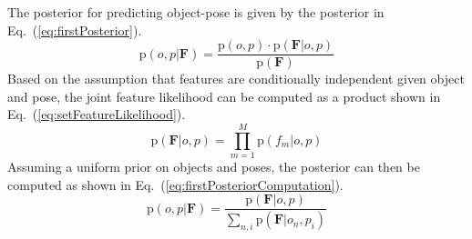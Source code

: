 \documentclass[conference]{IEEEtran}
\renewcommand{\eqref}[1]{Eq.~(\ref{#1})}
\newcommand{\prob}[1]{\text{p}(#1)} %
\newcommand{\set}[1]{\mathbf{#1}} %
\begin{document}
        The posterior for predicting object-pose is given by the posterior in \eqref{eq:firstPosterior}.
        \begin{equation}
            \label{eq:firstPosterior}
            \prob{o,p|\set{F}} = \frac{\prob{o,p} \cdot \prob{\set{F}|o,p}}{\prob{\set{F}}}
        \end{equation}
        Based on the assumption that features are conditionally independent given object and pose, the joint feature likelihood can be computed as a product shown in \eqref{eq:setFeatureLikelihood}.
        \begin{equation}
            \label{eq:setFeatureLikelihood}
            \prob{\set{F}|o,p} = \prod_{m=1}^{M} \prob{f_m|o,p}
        \end{equation}
        Assuming a uniform prior on objects and poses, the posterior can then be computed as shown in \eqref{eq:firstPosteriorComputation}.
        \begin{equation}
            \label{eq:firstPosteriorComputation}
            \prob{o,p|\set{F}} = \frac{\prob{\set{F}|o,p}}{\sum_{n,i} \prob{\set{F}|o_n,p_i}}
        \end{equation}
\end{document}
